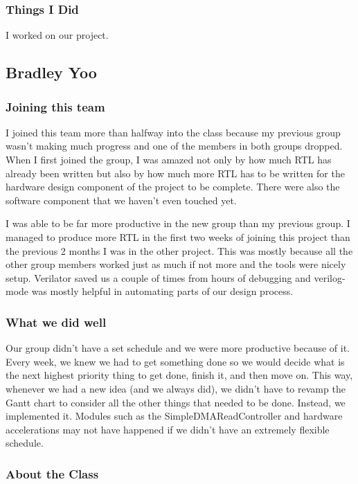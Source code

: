 \documentclass[10pt]{report}
\begin{document}
\subsubsection{Things I Did}

I worked on our project.

\subsection{Bradley Yoo}

\subsubsection{Joining this team}

I joined this team more than halfway into the class because my previous group wasn't making much progress and one of the members in both groups dropped. When I first joined the group, I was amazed not only by how much RTL has already been written but also by how much more RTL has to be written for the hardware design component of the project to be complete. There were also the software component that we haven't even touched yet.

I was able to be far more productive in the new group than my previous group. I managed to produce more RTL in the first two weeks of joining this project than the previous 2 months I was in the other project. This was mostly because all the other group members worked just as much if not more and the tools were nicely setup. Verilator saved us a couple of times from hours of debugging and verilog-mode was mostly helpful in automating parts of our design process.

\subsubsection{What we did well}

Our group didn't have a set schedule and we were more productive because of it. Every week, we knew we had to get something done so we would decide what is the next highest priority thing to get done, finish it, and then move on. This way, whenever we had a new idea (and we always did), we didn't have to revamp the Gantt chart to consider all the other things that needed to be done. Instead, we implemented it. Modules such as the SimpleDMAReadController and hardware accelerations may not have happened if we didn't have an extremely flexible schedule.

\subsubsection{About the Class}
\end{document}
